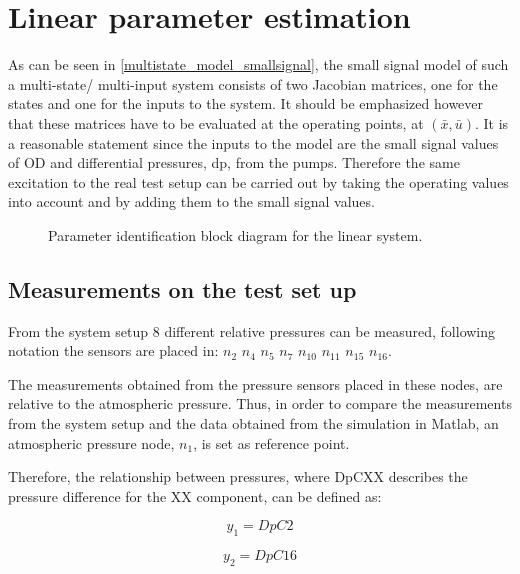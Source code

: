 \section{Linear parameter estimation} 
\label{LinParamEst}

As can be seen in \eqref{multistate_model_smallsignal}, the small signal model of such a multi-state/ multi-input system consists of two Jacobian matrices,
one for the states and one for the inputs to the system. It should be emphasized however that these matrices have to be evaluated at the operating points,
at $(\bar{x}, \bar{u})$. It is a reasonable statement since the inputs to the model are the small signal values of OD and differential pressures, dp,
from the pumps. Therefore the same excitation to the real test setup can be carried out by taking the operating values into account and by adding them 
to the small signal values. 

\begin{figure}[H]
\centering
 
\caption{Parameter identification block diagram for the linear system. }
\label{fig:parame_block_lin}
\end{figure}

\subsection{Measurements on the test set up}
\label{LinParamEst_measurements}

From the system setup $8$ different relative pressures can be measured, following  notation the sensors are placed in: 
$n_2$ $n_4$ $n_5$ $n_7$ $n_{10}$ $n_{11}$ $n_{15}$ $n_{16}$.

The measurements obtained from the pressure sensors placed in these nodes, are relative to the atmospheric pressure. Thus, in order to compare the measurements
from the system setup and the data obtained from the simulation in Matlab, an atmospheric pressure node, $n_1$, is set as reference point.

Therefore, the relationship between pressures, where DpCXX describes the pressure difference for the XX component, can be defined as:

\vspace{4mm}
\begin{equation}
     y_1 = DpC2 
\end{equation}

\vspace{4mm}
\begin{equation}
   y_2 = DpC16 
\end{equation}

